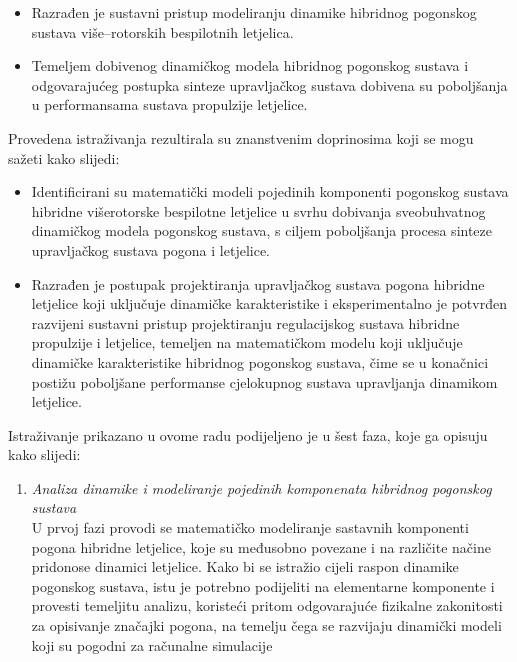 \begin{prosirenisazetak}
	\begin{itemize}

		\item Razrađen je sustavni pristup modeliranju dinamike hibridnog pogonskog sustava više–rotorskih bespilotnih letjelica. 

		
		\item Temeljem dobivenog dinamičkog modela hibridnog pogonskog sustava i odgovarajućeg postupka sinteze upravljačkog sustava dobivena su poboljšanja u performansama sustava propulzije letjelice.

	\end{itemize}

	Provedena istraživanja rezultirala su znanstvenim doprinosima koji se mogu sažeti kako slijedi:

	\begin{itemize}

		\item Identificirani su matematički modeli pojedinih komponenti pogonskog sustava hibridne višerotorske bespilotne letjelice u svrhu dobivanja sveobuhvatnog dinamičkog modela pogonskog sustava, s ciljem poboljšanja procesa sinteze upravljačkog sustava pogona i letjelice.

		
		\item 	Razrađen je postupak projektiranja upravljačkog sustava pogona hibridne letjelice koji uključuje dinamičke karakteristike i eksperimentalno je potvrđen razvijeni sustavni pristup projektiranju regulacijskog sustava hibridne propulzije i letjelice, temeljen na matematičkom modelu koji uključuje dinamičke karakteristike hibridnog pogonskog sustava, čime se u konačnici postižu poboljšane performanse cjelokupnog sustava upravljanja dinamikom letjelice.

	\end{itemize}

	Istraživanje prikazano u ovome radu podijeljeno je u šest faza, koje ga opisuju kako slijedi:

	\begin{enumerate}

		\item \textit{Analiza dinamike i modeliranje pojedinih komponenata hibridnog pogonskog sustava}\\
		U prvoj fazi provodi se matematičko modeliranje sastavnih komponenti pogona hibridne letjelice, koje su međusobno povezane i na različite načine pridonose dinamici letjelice. Kako bi se istražio cijeli raspon dinamike pogonskog sustava, istu je potrebno podijeliti na elementarne komponente i provesti temeljitu analizu, koristeći pritom odgovarajuće fizikalne zakonitosti za opisivanje značajki pogona, na temelju čega se razvijaju dinamički modeli koji su pogodni za računalne simulacije


\end{enumerate}
\end{prosirenisazetak}
